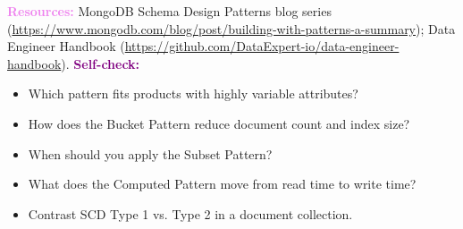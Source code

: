 \documentclass[11pt, a4paper]{article}
\newcommand{\selfcheck}[1]{\vspace{1mm}\noindent\textbf{\textcolor{purple}{Self-check:}} #1}
\newcommand{\resources}[1]{\vspace{1mm}\noindent\textbf{\textcolor{violet}{Resources:}} #1}
\begin{document}
\resources{MongoDB Schema Design Patterns blog series (\url{https://www.mongodb.com/blog/post/building-with-patterns-a-summary}); Data Engineer Handbook (\url{https://github.com/DataExpert-io/data-engineer-handbook}).}
\selfcheck{\begin{itemize}[label=-, itemsep=0pt, leftmargin=1.5em]
    \item Which pattern fits products with highly variable attributes?
    \item How does the Bucket Pattern reduce document count and index size?
    \item When should you apply the Subset Pattern?
    \item What does the Computed Pattern move from read time to write time?
    \item Contrast SCD Type 1 vs. Type 2 in a document collection.
\end{itemize}}
\end{document}
